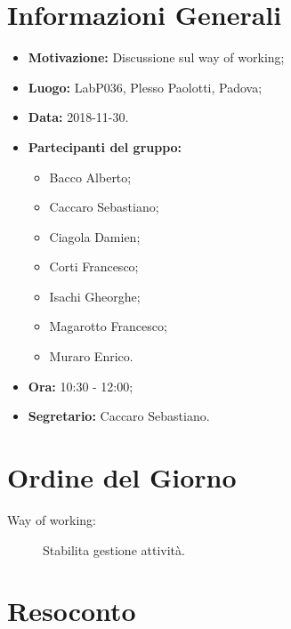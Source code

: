 \documentclass[a4paper, oneside, openany, dvipsnames, table]{article}
\begin{document}
\copertina{}


\newpage
\tableofcontents
\newpage
\section{Informazioni Generali}
\begin{itemize}
\item \textbf{Motivazione:} Discussione sul way of working;
\item \textbf{Luogo:} LabP036, Plesso Paolotti, Padova;
\item \textbf{Data:} 2018-11-30.
\item \textbf{Partecipanti del gruppo:} \hfill
	\begin{itemize}
	\item Bacco Alberto;
	\item Caccaro Sebastiano;
	\item Ciagola Damien;
	\item Corti Francesco;
	\item Isachi Gheorghe;
	\item Magarotto Francesco;
	\item Muraro Enrico.
	\end{itemize} 
\item \textbf{Ora:} 10:30 - 12:00;
\item \textbf{Segretario:} Caccaro Sebastiano.
\end{itemize}

\section{Ordine del Giorno}
\begin{description}
\item [Way of working: ] Stabilita gestione attività.
\end{description}

\section{Resoconto}
\end{document}
